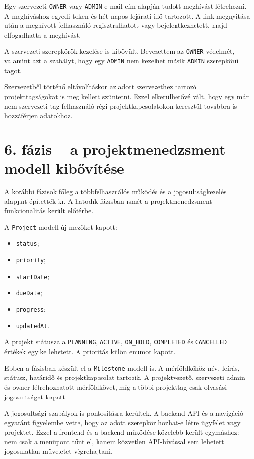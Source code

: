 \documentclass[11pt,a4paper]{report}
\begin{document}
    Egy szervezeti \texttt{OWNER} vagy \texttt{ADMIN} e-mail cím alapján tudott
    meghívást létrehozni. A meghíváshoz egyedi token és hét napos lejárati idő
    tartozott. A link megnyitása után a meghívott felhasználó regisztrálhatott vagy
    bejelentkezhetett, majd elfogadhatta a meghívást.

    A szervezeti szerepkörök kezelése is kibővült. Bevezettem az
    \texttt{OWNER} védelmét, valamint azt a szabályt, hogy egy
    \texttt{ADMIN} nem kezelhet másik \texttt{ADMIN} szerepkörű tagot.

    Szervezetből történő eltávolításkor az adott szervezethez tartozó
    projekttagságokat is meg kellett szüntetni. Ezzel elkerülhetővé vált, hogy egy
    már nem szervezeti tag felhasználó régi projektkapcsolatokon keresztül továbbra
    is hozzáférjen adatokhoz.

    \section{6. fázis -- a projektmenedzsment modell kibővítése}

    A korábbi fázisok főleg a többfelhasználós működés és a jogosultságkezelés
    alapjait építették ki. A hatodik fázisban ismét a projektmenedzsment
    funkcionalitás került előtérbe.

    A \texttt{Project} modell új mezőket kapott:
    \begin{itemize}
        \item \texttt{status};
        \item \texttt{priority};
        \item \texttt{startDate};
        \item \texttt{dueDate};
        \item \texttt{progress};
        \item \texttt{updatedAt}.
    \end{itemize}

    A projekt státusza a \texttt{PLANNING}, \texttt{ACTIVE},
    \texttt{ON\_HOLD}, \texttt{COMPLETED} és \texttt{CANCELLED} értékek
    egyike lehetett. A prioritás külön enumot kapott.

    Ebben a fázisban készült el a \texttt{Milestone} modell is. A mérföldkőhöz
    név, leírás, státusz, határidő és projektkapcsolat tartozik. A projektvezető,
    szervezeti admin és owner létrehozhatott mérföldkövet, míg a többi projekttag
    csak olvasási jogosultságot kapott.

    A jogosultsági szabályok is pontosításra kerültek. A backend API és a navigáció
    egyaránt figyelembe vette, hogy az adott szerepkör hozhat-e létre ügyfelet vagy
    projektet. Ezzel a frontend és a backend működése közelebb került egymáshoz:
    nem csak a menüpont tűnt el, hanem közvetlen API-hívással sem lehetett
    jogosulatlan műveletet végrehajtani.
\end{document}
